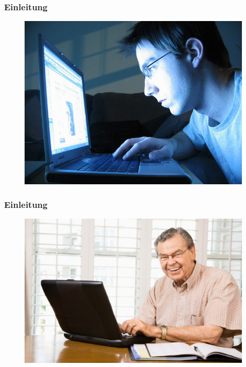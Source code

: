\documentclass[12pt]{beamer}
\begin{document}
\begin{frame}
  \frametitle{Einleitung}
  \begin{figure}
    \includegraphics[height=0.7\textheight]{img/internet_user1.jpg}
  \end{figure}
\end{frame}

\begin{frame}
  \frametitle{Einleitung}
  \begin{figure}
    \includegraphics[height=0.7\textheight]{img/internet_user3.jpg}
  \end{figure}
\end{frame}
\end{document}
